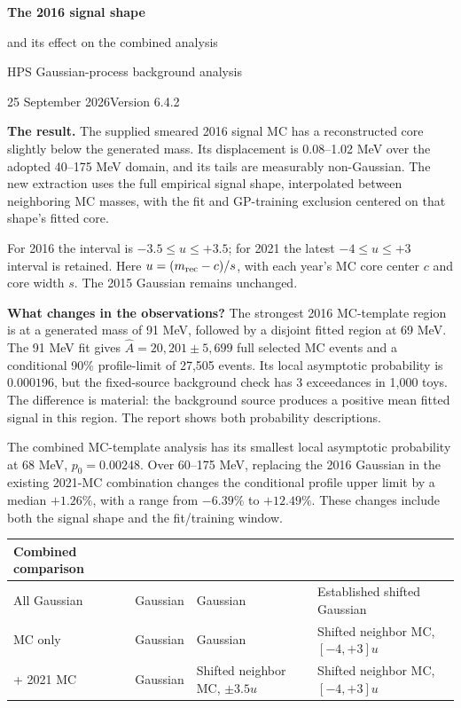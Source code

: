 \documentclass[11pt]{article}
\newcommand{\Ah}{\widehat A}\newcommand{\sh}{\widehat\sigma}
\begin{document}
{\LARGE\bfseries The 2016 signal shape\par and its effect on the combined analysis}\par
{\large HPS Gaussian-process background analysis}\par
25 September 2026\hfill Version 6.4.2

\textbf{The result.} The supplied smeared 2016 signal MC has a reconstructed core slightly below the generated mass. Its displacement is 0.08--1.02 MeV over the adopted 40--175 MeV domain, and its tails are measurably non-Gaussian. The new extraction uses the full empirical signal shape, interpolated between neighboring MC masses, with the fit and GP-training exclusion centered on that shape's fitted core.

For 2016 the interval is $-3.5\le u\le+3.5$; for 2021 the latest $-4\le u\le+3$ interval is retained. Here $u=(m_{\rm rec}-c)/s$, with each year's MC core center $c$ and core width $s$. The 2015 Gaussian remains unchanged.

\textbf{What changes in the observations?} The strongest 2016 MC-template region is at a generated mass of 91 MeV, followed by a disjoint fitted region at 69 MeV. The 91 MeV fit gives $\Ah=20{,}201\pm5{,}699$ full selected MC events and a conditional 90\% profile-limit of 27,505 events. Its local asymptotic probability is $0.000196$, but the fixed-source background check has 3 exceedances in 1,000 toys. The difference is material: the background source produces a positive mean fitted signal in this region. The report shows both probability descriptions.

The combined MC-template analysis has its smallest local asymptotic probability at 68 MeV, $p_0=0.00248$. Over 60--175 MeV, replacing the 2016 Gaussian in the existing 2021-MC combination changes the conditional profile upper limit by a median $+1.26\%$, with a range from $-6.39\%$ to $+12.49\%$. These changes include both the signal shape and the fit/training window.

\begin{center}\small\begin{tabular}{>{\raggedright\arraybackslash}p{1.30in}>{\raggedright\arraybackslash}p{1.12in}>{\raggedright\arraybackslash}p{1.12in}>{\raggedright\arraybackslash}p{1.75in}}\toprule
Combined comparison & 2015 & 2016 & 2021\\\midrule
All Gaussian & Gaussian & Gaussian & Established shifted Gaussian\\
2021 MC only & Gaussian & Gaussian & Shifted neighbor MC, $[-4,+3]u$\\
2016 + 2021 MC & Gaussian & Shifted neighbor MC, $\pm3.5u$ & Shifted neighbor MC, $[-4,+3]u$\\\bottomrule
\end{tabular}\end{center}
\end{document}
